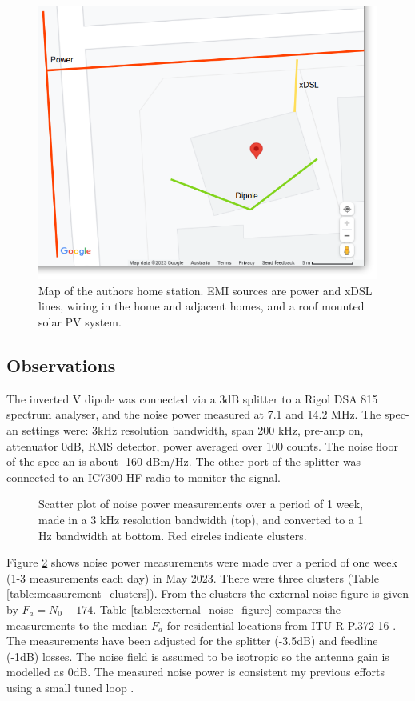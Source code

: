 \documentclass{article}
\begin{document}
\begin{figure}[h]
\caption{Map of the authors home station.  EMI sources are power and xDSL lines, wiring in the home and adjacent homes, and a roof mounted solar PV system.}
\label{fig:home_map}
\begin{center}
\includegraphics[width=12cm]{house_map.png}
\end{center}
\end{figure}

\subsection{Observations}

The inverted V dipole was connected via a 3dB splitter to a Rigol DSA 815 spectrum analyser, and the noise power measured at 7.1 and 14.2 MHz.  The spec-an settings were: 3kHz resolution bandwidth, span 200 kHz, pre-amp on, attenuator 0dB, RMS detector, power averaged over 100 counts.  The noise floor of the spec-an is about -160 dBm/Hz. The other port of the splitter was connected to an IC7300 HF radio to monitor the signal.

\begin{figure}[h]
\caption{Scatter plot of noise power measurements over a period of 1 week, made in a 3 kHz resolution bandwidth (top), and converted to a 1 Hz bandwidth at bottom.  Red circles indicate clusters.}
\label{fig:noise_measurements}
\begin{center}

\end{center}
\end{figure}

Figure \ref{fig:noise_measurements} shows noise power measurements were made over a period of one week (1-3 measurements each day) in May 2023.  There were three clusters (Table \ref{table:measurement_clusters}). From the clusters the external noise figure is given by $F_a = N_0 - 174$. Table \ref{table:external_noise_figure} compares the measurements to the median $F_a$ for residential locations from ITU-R P.372-16 \cite{itu372-16}. The measurements have been adjusted for the splitter (-3.5dB) and feedline (-1dB) losses.  The noise field is assumed to be isotropic so the antenna gain is modelled as 0dB. The measured noise power is consistent my previous efforts using a small tuned loop \cite{rowetel_noise_city}.
\end{document}
